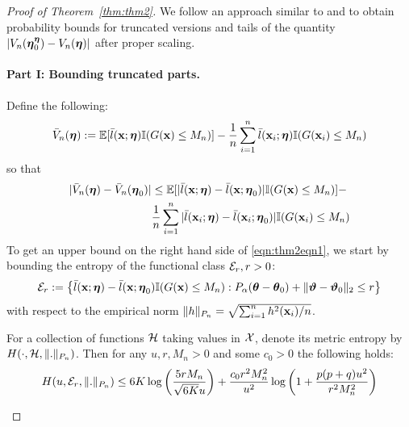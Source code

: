 \documentclass[11pt,letterpaper]{article}
\numberwithin{equation}{section}
\begin{document}
\begin{proof}[Proof of Theorem~\ref{thm:thm2}]
We follow an approach similar to \cite{StadlerEtal10} and \cite{FengSimon17} to obtain probability bounds for truncated versions and tails of the quantity $|V_n({\boldsymbol{\eta}}_0^{\boldsymbol{\eta}}) - V_n({\boldsymbol{\eta}})|$ after proper scaling.

\paragraph{Part I: Bounding truncated parts.} Define the following:
%
\begin{align*}
\bar V_n({\boldsymbol{\eta}}) := {\mathbb{E}} [\bar l({\bf{x}}; {\boldsymbol{\eta}}) {\mathbb{I}}(G({\bf{x}}) \leq M_n)] -
\frac{1}{n} \sum_{i=1}^n\bar l({\bf{x}}_i; {\boldsymbol{\eta}}) {\mathbb{I}}(G({\bf{x}}_i) \leq M_n)
\end{align*}
%
so that
\begin{align}
| \bar V_n({\boldsymbol{\eta}}) - \bar V_n({\boldsymbol{\eta}}_0) | & \leq
{\mathbb{E}} [| \bar l({\bf{x}}; {\boldsymbol{\eta}}) -  \bar l({\bf{x}}; {\boldsymbol{\eta}}_0)| {\mathbb{I}}(G({\bf{x}}) \leq M_n)] - \notag\\
& \frac{1}{n} \sum_{i=1}^n | \bar l({\bf{x}}_i; {\boldsymbol{\eta}}) -  \bar l({\bf{x}}_i; {\boldsymbol{\eta}}_0)| {\mathbb{I}}(G({\bf{x}}_i) \leq M_n)
\label{eqn:thm2eqn1}
\end{align}
%
To get an upper bound on the right hand side of \eqref{eqn:thm2eqn1}, we start by bounding the entropy of the functional class ${\cal{E}}_r, r >0$:
%
$$
{\cal{E}}_r := \left\{ \bar l({\bf{x}}; {\boldsymbol{\eta}}) -  \bar l({\bf{x}}; {\boldsymbol{\eta}}_0) {\mathbb{I}}(G({\bf{x}}) \leq M_n):
P_\alpha({\boldsymbol{\theta}} - {\boldsymbol{\theta}}_0) + \| {\boldsymbol{\vartheta}} - {\boldsymbol{\vartheta}}_0 \|_2 \leq r \right\}
$$
%
with respect to the empirical norm $\| h \|_{P_n} = \sqrt{\sum_{i=1}^n h^2 ({\bf{x}}_i)/n}$.

\begin{Lemma}\label{lemma:thm2lemma1}
For a collection of functions ${\cal{H}}$ taking values in ${\cal{X}}$, denote its metric entropy by $H(\cdot, {\cal{H}}, \|.\|_{P_n})$. Then for any $u, r, M_n>0$ and some $c_0 > 0$ the following holds:
%
$$
H(u, {\cal{E}}_r, \|.\|_{P_n}) \leq 6K \log \left( \frac{5r M_n}{\sqrt{6K}u} \right) +
\frac{ c_0 r^2 M_n^2}{u^2} \log \left(1 + \frac{p(p+q) u^2}{r^2 M_n^2} \right)
$$
%
\end{Lemma}


\end{proof}
\end{document}
